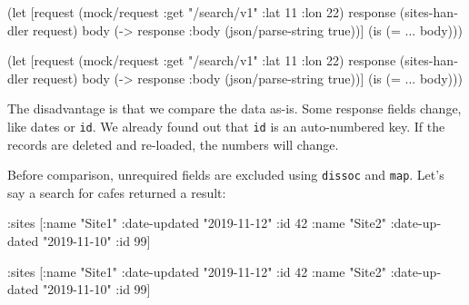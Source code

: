 \ifx\DEVICETYPE\MOBILE

\begin{english}
  \begin{clojure}
(let [request (mock/request
                :get "/search/v1"
                {:lat 11 :lon 22})
      response (sites-handler request)
      body (-> response
               :body
               (json/parse-string
                 true))]
  (is (= {...} body)))
  \end{clojure}
\end{english}

\else

\begin{english}
  \begin{clojure}
(let [request (mock/request :get "/search/v1"
                            {:lat 11 :lon 22})
      response (sites-handler request)
      body (-> response :body (json/parse-string true))]
  (is (= {...} body)))
  \end{clojure}
\end{english}

\fi

The disadvantage is that we compare the data as-is. Some response fields change, like dates or \verb|id|. We already found out that \verb|id| is an auto-numbered key. If the records are deleted and re-loaded, the numbers will change.

Before comparison, unrequired fields are excluded using \verb|dissoc| and \verb|map|. Let's say a search for cafes returned a result:

\ifx\DEVICETYPE\MOBILE

\begin{english}
  \begin{clojure}
{:sites [{:name "Site1"
          :date-updated "2019-11-12"
          :id 42}
         {:name "Site2"
          :date-updated "2019-11-10"
          :id 99}]}
  \end{clojure}
\end{english}

\else

\begin{english}
  \begin{clojure}
{:sites [{:name "Site1" :date-updated "2019-11-12" :id 42}
         {:name "Site2" :date-updated "2019-11-10" :id 99}]}
  \end{clojure}
\end{english}

\fi


